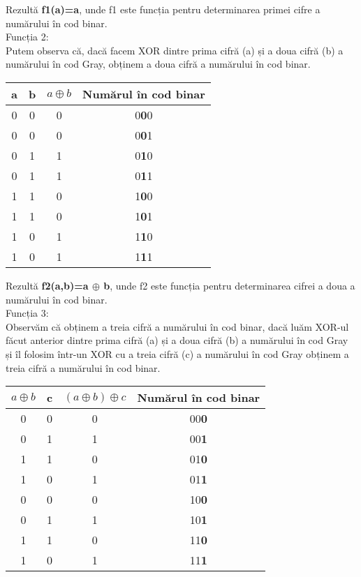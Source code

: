 \documentclass{article}
\begin{document}
Rezultă \textbf{f1(a)=a}, unde f1 este funcția pentru determinarea primei cifre a numărului în cod binar.\\ Funcția 2:\\ Putem observa că, dacă facem XOR dintre prima cifră (a) și a doua cifră (b) a numărului în cod Gray, obținem a doua cifră a numărului în cod binar.
\begin{center}
\begin{tabular}{||c c c c||} 
\hline
 a & b & $a \oplus b $& Numărul în cod binar \\ [0.5ex] 
 \hline\hline
 0 & 0 & 0 & 0\textbf{0}0 \\ 
 \hline
 0 & 0 & 0 & 0\textbf{0}1 \\
 \hline
 0 & 1 & 1 & 0\textbf{1}0 \\
 \hline
 0 & 1 & 1 & 0\textbf{1}1 \\
 \hline
 1 & 1 & 0 & 1\textbf{0}0 \\ 
 \hline
 1 & 1 & 0 & 1\textbf{0}1 \\
 \hline
 1 & 0 & 1 & 1\textbf{1}0 \\
 \hline
 1 & 0 & 1 & 1\textbf{1}1 \\ 
 \hline 
\end{tabular}
\end{center}
\text Rezultă \textbf{f2(a,b)=a $\oplus$ b}, unde f2 este funcția pentru determinarea cifrei a doua a numărului în cod binar.\\ Funcția 3:\\Observăm că obținem a treia cifră a numărului în cod binar, dacă luăm XOR-ul făcut anterior dintre prima cifră (a) și a doua cifră (b) a numărului în cod Gray și îl folosim într-un XOR cu a treia cifră (c) a numărului în cod Gray obținem a treia cifră a numărului în cod binar.
\begin{center}
\begin{tabular}{||c c c c||} 
\hline
 $a \oplus b $ & c & $(a \oplus b) \oplus c$ & Numărul în cod binar \\ [0.5ex] 
 \hline\hline
 0 & 0 & 0 & 00\textbf{0} \\ 
 \hline
 0 & 1 & 1 & 00\textbf{1} \\
 \hline
 1 & 1 & 0 & 01\textbf{0} \\
 \hline
 1 & 0 & 1 & 01\textbf{1} \\
 \hline
 0 & 0 & 0 & 10\textbf{0} \\ 
 \hline
 0 & 1 & 1 & 10\textbf{1} \\
 \hline
 1 & 1 & 0 & 11\textbf{0} \\
 \hline
 1 & 0 & 1 & 11\textbf{1} \\ 
 \hline 
\end{tabular}
\end{center}
\end{document}

